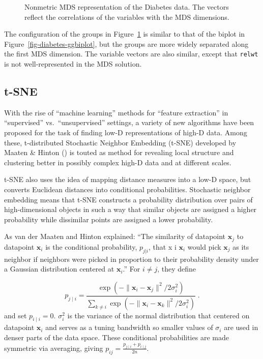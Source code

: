 \documentclass[
  letterpaper,
  10pt,
  krantz2]{krantz}
\begin{document}
{\begin{figure}[H]
{}

\caption{\label{fig-diabetes-mds}Nonmetric MDS representation of the
Diabetes data. The vectors reflect the correlations of the variables
with the MDS dimensions.}

\end{figure}%

The configuration of the groups in Figure~\ref{fig-diabetes-mds} is
similar to that of the biplot in Figure~\ref{fig-diabetes-ggbiplot}, but
the groups are more widely separated along the first MDS dimension. The
variable vectors are also similar, except that \texttt{relwt} is not
well-represented in the MDS solution.

\subsection{t-SNE}\label{t-sne}

With the rise of ``machine learning'' methods for ``feature extraction''
in ``supervised'' vs.~``unsupervised'' settings, a variety of new
algorithms have been proposed for the task of finding low-D
representations of high-D data. Among these, t-distributed Stochastic
Neighbor Embedding (t-SNE) developed by Maaten \& Hinton
() is touted as method for
revealing local structure and clustering better in possibly complex
high-D data and at different scales.

t-SNE also uses the idea of mapping distance measures into a low-D
space, but converts Euclidean distances into conditional probabilities.
Stochastic neighbor embedding means that t-SNE constructs a probability
distribution over pairs of high-dimensional objects in such a way that
similar objects are assigned a higher probability while dissimilar
points are assigned a lower probability.

As van der Maaten and Hinton explained: ``The similarity of datapoint
\(\mathbf{x}_{j}\) to datapoint \(\mathbf{x}_{i}\) is the conditional
probability, \(p_{j|i}\), that x i \(\mathbf{x}_{i}\) would pick
\(\mathbf{x}_{j}\) as its neighbor if neighbors were picked in
proportion to their probability density under a Gaussian distribution
centered at \(\mathbf{x}_{i}\).'' For \(i \ne j\), they define

\[
p_{j\mid i} = \frac{\exp(-\lVert\mathbf{x}_i - \mathbf{x}_j\rVert^2 / 2\sigma_i^2)}{\sum_{k \neq i} \exp(-\lVert\mathbf{x}_i - \mathbf{x}_k\rVert^2 / 2\sigma_i^2)} \;. 
\] and set \(p_{i\mid i} = 0\). \(\sigma^2_i\) is the variance of the
normal distribution that centered on datapoint \(\mathbf{x}_{i}\) and
serves as a tuning bandwidth so smaller values of \(\sigma _{i}\) are
used in denser parts of the data space. These conditional probabilities
are made symmetric via averaging, giving
\(p_{ij} = \frac{p_{j\mid i} + p_{i\mid j}}{2n}\).

}
\end{document}
